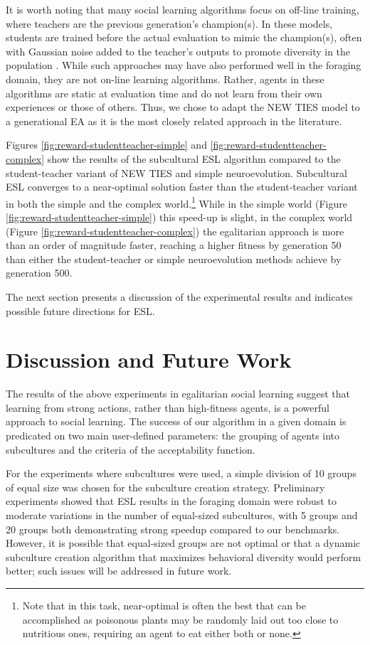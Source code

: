 \documentclass{sig-alternate}
\begin{document}
It is worth noting that many social learning algorithms focus on off-line training, where teachers are the previous generation's champion(s). In these models, students are trained before the actual evaluation to mimic the champion(s), often with Gaussian noise added to the teacher's outputs to promote diversity in the population \cite{denaro1996cultural}. While such approaches may have also performed well in the foraging domain, they are not on-line learning algorithms. Rather, agents in these algorithms are static at evaluation time and do not learn from their own experiences or those of others. Thus, we chose to adapt the NEW TIES model to a generational EA as it is the most closely related approach in the literature.

Figures \ref{fig:reward-studentteacher-simple} and \ref{fig:reward-studentteacher-complex} show the results of the subcultural ESL algorithm compared to the student-teacher variant of NEW TIES and simple neuroevolution. Subcultural ESL converges to a near-optimal solution faster than the student-teacher variant in both the simple and the complex world.\footnote{Note that in this task, near-optimal is often the best that can be accomplished as poisonous plants may be randomly laid out too close to nutritious ones, requiring an agent to eat either both or none.} While in the simple world (Figure \ref{fig:reward-studentteacher-simple}) this speed-up is slight, in the complex world (Figure  \ref{fig:reward-studentteacher-complex}) the egalitarian approach is more than an order of magnitude faster, reaching a higher fitness by generation 50 than either the student-teacher or simple neuroevolution methods achieve by generation 500.

The next section presents a discussion of the experimental results and indicates possible future directions for ESL.

\section{Discussion and Future Work}
\label{sec:future}
The results of the above experiments in egalitarian social learning suggest that learning from strong actions, rather than high-fitness agents, is a powerful approach to social learning. The success of our algorithm in a given domain is predicated on two main user-defined parameters: the grouping of agents into subcultures and the criteria of the acceptability function.

For the experiments where subcultures were used, a simple division of 10 groups of equal size was chosen for the subculture creation strategy. Preliminary experiments showed that ESL results in the foraging domain were robust to moderate variations in the number of equal-sized subcultures, with 5 groups and 20 groups both demonstrating strong speedup compared to our benchmarks. However, it is possible that equal-sized groups are not optimal or that a dynamic subculture creation algorithm that maximizes behavioral diversity would perform better; such issues will be addressed in future work.
\end{document}
